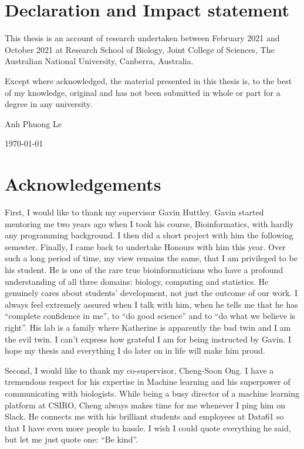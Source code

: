 \chapter*{Declaration and Impact statement}

This thesis is an account of research undertaken between February 2021 and  October 2021 at Research School of Biology, Joint College of Sciences, The Australian National University, Canberra, Australia.

Except where acknowledged, the material presented in this thesis is, to the best of my knowledge, original and has not been submitted in whole or part for a degree in any university.

\vspace{20mm}  %

\large
\hspace{12cm} Anh Phuong Le\par
\hspace{12cm} \today

\normalsize
\chapter*{Acknowledgements}

First, I would like to thank my supervisor Gavin Huttley. Gavin started mentoring me two years ago when I took his course, Bioinformatics, with hardly any programming background. I then did a short project with him the following semester. Finally, I came back to undertake Honours with him this year. Over such a long period of time, my view remains the same, that I am privileged to be his student. He is one of the rare true bioinformaticians who have a profound understanding of all three domains: biology, computing and statistics. He genuinely cares about students' development, not just the outcome of our work. I always feel extremely assured when I talk with him, when he tells me that he has ``complete confidence in me'', to ``do good science'' and to ``do what we believe is right''. His lab is a family where Katherine is apparently the bad twin and I am the evil twin. I can't express how grateful I am for being instructed by Gavin. I hope my thesis and everything I do later on in life will make him proud.

Second, I would like to thank my co-supervisor, Cheng-Soon Ong. I have a tremendous respect for his expertise in Machine learning and his superpower of communicating with biologists. While being a busy director of a machine learning platform at CSIRO, Cheng always makes time for me whenever I ping him on Slack. He connects me with his brilliant students and employees at Data61 so that I have even more people to hassle. I wish I could quote everything he said, but let me just quote one: ``Be kind''.

